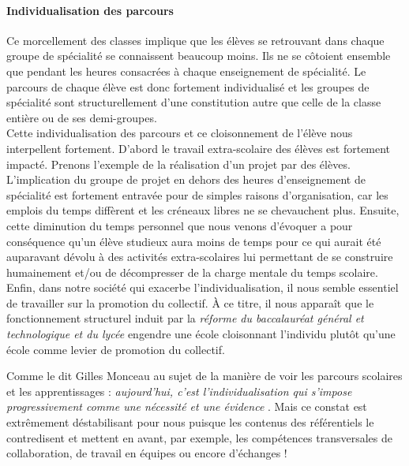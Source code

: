\paragraph{Individualisation des parcours}
%
%
Ce morcellement des classes implique que les élèves se retrouvant dans chaque groupe de spécialité se connaissent beaucoup moins. Ils ne se côtoient ensemble que pendant les heures consacrées à chaque enseignement de spécialité.  Le parcours de chaque élève est donc fortement individualisé et les groupes de spécialité sont structurellement d'une constitution autre que celle de la classe entière ou de ses demi-groupes.
\\
Cette individualisation des parcours et ce cloisonnement de l'élève nous interpellent fortement.
%
D'abord le travail extra-scolaire des élèves est fortement impacté. Prenons l'exemple de la réalisation d'un projet par des élèves. L'implication du groupe de projet en dehors des heures d'enseignement de spécialité est fortement entravée pour de simples raisons d'organisation, car les emplois du temps diffèrent et les créneaux libres ne se chevauchent plus.
%
Ensuite, cette diminution du temps personnel que nous venons d'évoquer a pour conséquence qu'un élève studieux aura moins de temps pour ce qui aurait été auparavant dévolu à des activités extra-scolaires lui permettant de se construire humainement et/ou de décompresser de la charge mentale du temps scolaire.
%
Enfin, dans notre société qui exacerbe l'individualisation, il nous semble essentiel de travailler sur la promotion du collectif. À ce titre, il nous apparaît que le fonctionnement structurel induit par la \emph{réforme du baccalauréat général et technologique et du lycée} engendre une école cloisonnant l'individu plutôt qu'une école comme levier de promotion du collectif. 

Comme le dit Gilles Monceau au sujet de la manière de voir les parcours scolaires et les apprentissages : \textit{aujourd'hui, c'est l'individualisation qui s'impose progressivement comme une nécessité et une évidence} \citep{monceau_groupe_2005}. Mais ce constat est extrêmement déstabilisant pour nous puisque les contenus des référentiels le contredisent et mettent en avant, par exemple, les compétences transversales de collaboration, de travail en équipes ou encore d'échanges !



